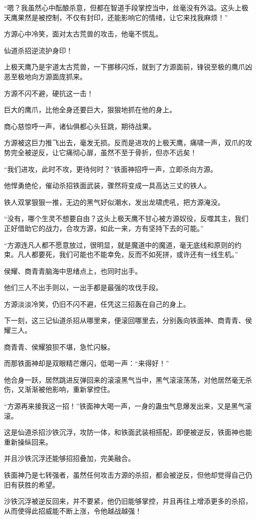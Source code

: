 \begin{this_body}
“嗯？我虽然心中酝酿杀意，但都在智道手段掌控当中，丝毫没有外溢。这头上极天鹰果然是被控制，不仅有封印，还能影响它的情绪，让它来找我麻烦！”

方源心中冷笑，面对太古荒兽的攻击，他毫不慌乱。

仙道杀招逆流护身印！

上极天鹰乃是宇道太古荒兽，一下挪移闪烁，就到了方源面前，锋锐至极的鹰爪凶恶至极地向方源面庞抓来。

方源不闪不避，硬抗这一击！

巨大的鹰爪，比他全身还要巨大，狠狠地抓在他的身上。

商心慈惊呼一声，诸仙俱都心头狂跳，期待战果。

方源被这巨力推飞出去，毫发无损。反而是进攻的上极天鹰，痛啸一声，双爪的攻势完全被逆反，让它痛彻心扉，虽然不至于骨折，但亦不远矣！

“我们进攻，此时不攻，更待何时？”铁面神招呼一声，立即杀向方源。

他悍勇绝伦，催动杀招铁面武装，骤然将变成一具高达三丈的铁人。

铁人双掌狠狠一推，无边的黑气好似潮水，发出龙啸虎吼，把方源淹没。

“没有，哪个生灵不想要自由？这头上极天鹰不甘心被方源奴役，反噬其主，我们正好借助它的战力，合攻方源，如此一来，方有坚持下去的可能。”

“方源连凡人都不愿意放过，很明显，就是魔道中的魔道，毫无底线和原则的约束。凡人都要死，我们可能也不能幸免，反而不如死拼，或许还有一线生机。”

侯耀、商青青脑海中思绪点上，也同时出手。

他们三人不出手则以，一出手都是最强的攻伐手段。

方源淡淡冷笑，仍旧不闪不避，任凭这三招轰在自己的身上。

下一刻，这三记仙道杀招从哪里来，便滚回哪里去，分别轰向铁面神、商青青、侯耀三人。

商青青、侯耀狼狈不堪，急忙闪躲。

而那铁面神却是双眼精芒爆闪，低喝一声：“来得好！”

他合身一跃，居然跳进反弹回来的滚滚黑气当中，黑气滚滚荡荡，对他居然毫无杀伤，又渐渐被他影响，重新掌控住。

“方源再来接我这一招！”铁面神大喝一声，一身的蛊虫气息爆发出来，又是黑气滚滚。

这是仙道杀招沙铁沉浮，攻防一体，和铁面武装相搭配，即便被逆反，铁面神也能重新操纵回来。

并且沙铁沉浮还能够招招叠加，完美融合。

铁面神乃是七转强者，虽然任何攻击方源的杀招，都会被逆反，但他却觉得自己仍旧有获胜的希望。

沙铁沉浮被逆反回来，并不要紧，他仍旧能够掌控，并且再往上增添更多的杀招，从而使得此招威能不断上涨，令他越战越强！

\end{this_body}

